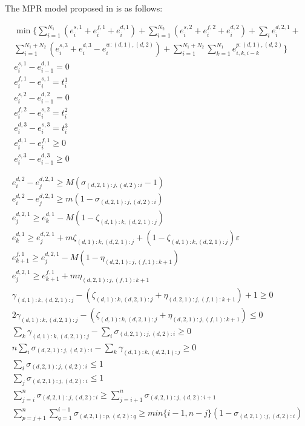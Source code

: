 \documentclass[]{interact}
\theoremstyle{plain}%
\theoremstyle{definition}
\theoremstyle{remark}
\begin{document}
The MPR model proposed in \cite{chan2008optimization} is as follows:

\begin{eqnarray}
\min\{\sum_{i=1}^{N_1} (e^{s,1}_i+e^{f,1}_{i}+e^{d,1}_{i})+\sum_{i=1}^{N_2}(e^{s,2}_i+e^{f,2}_{i}+e^{d,2}_{i}) + \sum_{i}^{} e^{d,2,1}_{i}+\nonumber\\
\sum_{i=1}^{N_1+N_2}(e^{s,3}_i+e^{d,3}_{i}-e^{w:(d,1),(d,2)}_i) +\sum_{i=1}^{N_1+N_2}\sum_{k=1}^{N_1} e^{p:(d,1),(d,2)}_{i,k,i-k}\}\nonumber\\
e^{s,1}_i - e^{d,1}_{i-1} = 0\label{MergeErg:1} \\
e^{f,1}_{i} - e^{s,1}_{i} = t^{1}_i\\
e^{s,2}_i - e^{d,2}_{i-1} = 0\\
e^{f,2}_{i} - e^{s,2}_{i} = t^{2}_i\\
e^{d,3}_{i} - e^{s,3}_{i} = t^{3}_i\\
e^{d,1}_{i} - e^{f,1}_{i} \ge 0\label{MergeErg:6} \\
e^{s,3}_{i} - e^{d,3}_{i-1} \ge 0\label{MergeErg:7} 
\end{eqnarray}


\begin{eqnarray}
e^{d,2}_i-e^{d,2,1}_j\ge M(\sigma_{(d,2,1):j,(d,2):i}-1)\label{MergeErg:8.1}\\
e^{d,2}_i-e^{d,2,1}_j\ge m(1 - \sigma_{(d,2,1):j,(d,2):i})\\
e^{d,2,1}_{j} \ge e^{d,1}_{k} - M(1-\zeta_{(d,1):k,(d,2,1):j})\\ 
e^{d,1}_{k} \ge e^{d,2,1}_{j} + m\zeta_{(d,1):k,(d,2,1):j} +(1-\zeta_{(d,1):k,(d,2,1):j})\varepsilon\\ 
e^{f,1}_{k+1} \ge e^{d,2,1}_{j} - M(1-\eta_{(d,2,1):j,(f,1):k+1})\\
e^{d,2,1}_{j} \ge e^{f,1}_{k+1} + m\eta_{(d,2,1):j,(f,1):k+1}\\
\gamma_{(d,1):k,(d,2,1):j} - (\zeta_{(d,1):k,(d,2,1):j} + \eta_{(d,2,1):j,(f,1):k+1})+1\ge 0\\
2\gamma_{(d,1):k,(d,2,1):j}-(\zeta_{(d,1):k,(d,2,1):j} + \eta_{(d,2,1):j,(f,1):k+1})\le 0\\
\sum_k\gamma_{(d,1):k,(d,2,1):j}-\sum_i \sigma_{(d,2,1):j,(d,2):i} \ge 0\\
n\sum_{i}\sigma_{(d,2,1):j,(d,2):i} - \sum_k\gamma_{(d,1):k,(d,2,1):j}\ge 0\\
\sum_{i}\sigma_{(d,2,1):j,(d,2):i}\le 1\\
\sum_{j}\sigma_{(d,2,1):j,(d,2):i}\le 1\\
\sum_{j=i}^{n}\sigma_{(d,2,1):j,(d,2):i}\ge \sum_{j=i+1}^{n}\sigma_{(d,2,1):j,(d,2):i+1}\\
\sum_{p=j+1}^n\sum_{q=1}^{i-1} \sigma_{(d,2,1):p,(d,2):q} \ge min\{i-1,n-j\}(1-\sigma_{(d,2,1):j,(d,2):i})\label{MergeErg:8.2}
\end{eqnarray}
\end{document}
